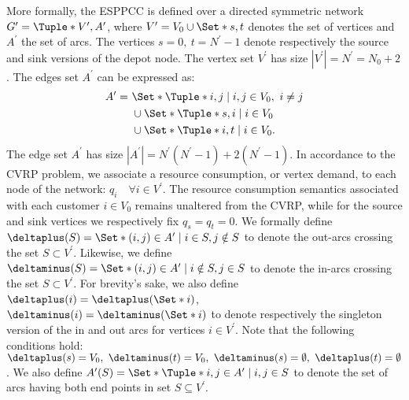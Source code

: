 More formally, the ESPPCC is defined over a directed symmetric network
$G^\prime = \Tuple*{V^\prime, A^\prime}$,
where $V^\prime = V_0 \cup \Set*{s, t}$ denotes the set of vertices and $A^\prime$ the set of arcs.
The vertices $s = 0,\ t = N^\prime - 1$ denote respectively the source and sink versions of the depot node.
The vertex set $V^\prime$ has size $|V^\prime| = N^\prime = N_0 + 2$.
The edges set $A^\prime$ can be expressed as:
\begin{equation}
	\begin{aligned}
		A^\prime = \  & \Set*{\Tuple*{i, j} \mid i, j \in V_0,\ i \ne j} \\
		              & \cup \Set*{\Tuple*{s, i} \mid i \in V_0}         \\
		              & \cup \Set*{\Tuple*{i, t} \mid i \in V_0}.
	\end{aligned}
\end{equation}
The edge set $A^\prime$ has size $|A^\prime| = N^\prime(N^\prime - 1) + 2(N^\prime - 1)$.
In accordance to the CVRP problem,
we associate a resource consumption, or vertex demand,
to each node of the network: $q_i \quad \forall i \in V^\prime$.
The resource consumption semantics associated with each customer
$i \in V_0$ remains unaltered  from the CVRP, while for the source and sink vertices
we respectively fix $q_{s} = q_{t} = 0$.
We formally define $\deltaplus(S) = \Set*{(i, j) \in A^\prime \mid i \in S, j \notin S}$
to denote the out-arcs crossing the set $S \subset V^\prime$.
Likewise, we define $\deltaminus(S) = \Set*{(i, j) \in A^\prime \mid i \notin S, j \in S}$
to denote the in-arcs crossing the set $S \subset V^\prime$.
For brevity’s sake,
we also define $\deltaplus(i) = \deltaplus(\Set*{i})$, $\deltaminus(i) = \deltaminus(\Set*{i})$
to denote respectively the singleton version of the in and out arcs for vertices $i \in V^\prime$.
Note that the following conditions hold:
$\deltaplus(s) = V_0,\ \deltaminus(t) = V_0,\ \deltaminus(s) = \emptyset,\ \deltaplus(t) = \emptyset$.
We also define $A^\prime(S) = \Set*{\Tuple*{i, j} \in A^\prime \mid i, j \in S}$
to denote the set of arcs having both end points in set $S \subseteq V^\prime$.

